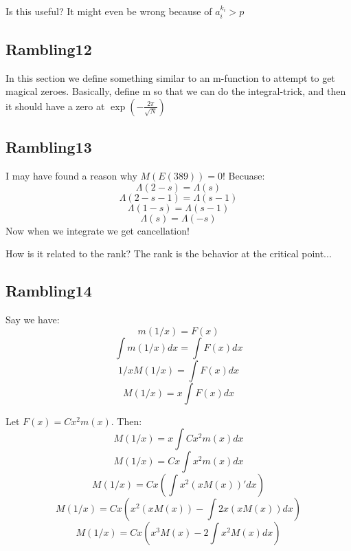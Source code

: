 \documentclass[a4paper]{amsart}
\begin{document}
Is this useful?
It might even be wrong because of $a_i^{k_i} > p$



\subsection{Rambling12}
In this section we define something similar to an m-function to attempt to get magical zeroes. Basically, define m so that we can do the integral-trick, and then it should have a zero at $\exp(-\frac{2\pi}{\sqrt{N}})$


\subsection{Rambling13}
I may have found a reason why $M(E(389)) = 0$! Becuase:
$$\Lambda(2 - s) = \Lambda(s)$$
$$\Lambda(2 - s - 1) = \Lambda(s - 1)$$
$$\Lambda(1 - s) = \Lambda(s - 1)$$
$$\Lambda(s) = \Lambda(-s)$$
Now when we integrate we get cancellation!

How is it related to the rank? The rank is the behavior at the critical point...

\subsection{Rambling14}

Say we have:
$$m(1/x) = F(x)$$
$$\int m(1/x) dx = \int F(x) dx$$
$$1/xM(1/x) = \int F(x) dx$$
$$M(1/x) = x \int F(x) dx$$

Let $F(x) = Cx^2m(x)$. Then:
$$M(1/x) = x \int Cx^2m(x) dx$$
$$M(1/x) = Cx \int x^2m(x) dx$$
$$M(1/x) = Cx (\int x^2(xM(x))' dx)$$
$$M(1/x) = Cx (x^2(xM(x)) - \int 2x(xM(x)) dx)$$
$$M(1/x) = Cx (x^3M(x) - 2 \int x^2M(x) dx)$$
\end{document}
